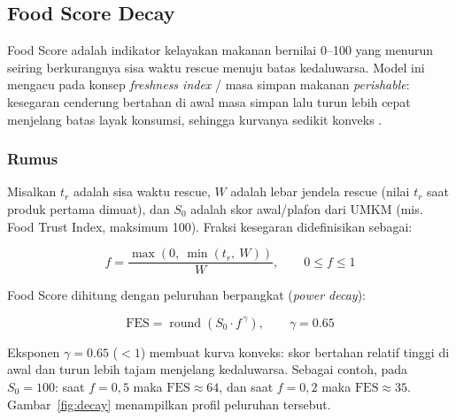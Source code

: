 \subsection{Food Score Decay}

Food Score adalah indikator kelayakan makanan bernilai 0--100 yang menurun seiring
berkurangnya sisa waktu rescue menuju batas kedaluwarsa. Model ini mengacu pada konsep
\textit{freshness index} / masa simpan makanan \textit{perishable}: kesegaran cenderung bertahan
di awal masa simpan lalu turun lebih cepat menjelang batas layak konsumsi, sehingga kurvanya
sedikit konveks \cite{iotshelflife2025}.

\subsubsection{Rumus}

Misalkan $t_{r}$ adalah sisa waktu rescue, $W$ adalah lebar jendela rescue (nilai $t_{r}$ saat
produk pertama dimuat), dan $S_{0}$ adalah skor awal/plafon dari UMKM (mis. Food Trust Index,
maksimum 100). Fraksi kesegaran didefinisikan sebagai:

\begin{equation}
f = \frac{\max(0,\ \min(t_{r},\ W))}{W}, \qquad 0 \le f \le 1
\end{equation}

Food Score dihitung dengan peluruhan berpangkat (\textit{power decay}):

\begin{equation}
\mathrm{FES} = \operatorname{round}\!\left( S_{0} \cdot f^{\,\gamma} \right), \qquad \gamma = 0.65
\end{equation}

Eksponen $\gamma = 0.65$ ($<1$) membuat kurva konveks: skor bertahan relatif tinggi di awal dan
turun lebih tajam menjelang kedaluwarsa. Sebagai contoh, pada $S_{0}=100$: saat $f=0{,}5$ maka
$\mathrm{FES}\approx 64$, dan saat $f=0{,}2$ maka $\mathrm{FES}\approx 35$. Gambar~\ref{fig:decay}
menampilkan profil peluruhan tersebut.

